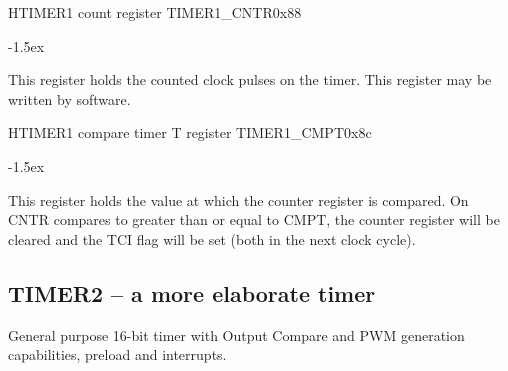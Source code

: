 \documentclass[12pt]{article}
\begin{document}
\begin{register}{H}{TIMER1 count register TIMER1\_CNTR}{0x88}
\label{timer1cntr}
%
\regnewline%
\end{register}
\begin{regdesc}[0.8\textwidth]\begin{reglist}[0000]
\itemsep-1.5ex
\item[CNTR] This register holds the counted clock pulses on the timer. This register may be written by software.
\end{reglist}\end{regdesc}

\begin{register}{H}{TIMER1 compare timer T register TIMER1\_CMPT}{0x8c}
\label{timer1cmpt}
%
\regnewline%
\end{register}
\begin{regdesc}[0.8\textwidth]\begin{reglist}[0000]
\itemsep-1.5ex
\item[CMPT] This register holds the value at which the counter register is compared. On CNTR compares to greater than or equal to CMPT, the counter register will be cleared and the TCI flag will be set (both in the next clock cycle).
\end{reglist}\end{regdesc}

\subsection{TIMER2 -- a more elaborate timer}
General purpose 16-bit timer with Output Compare and PWM generation capabilities, preload and interrupts.
\end{document}

